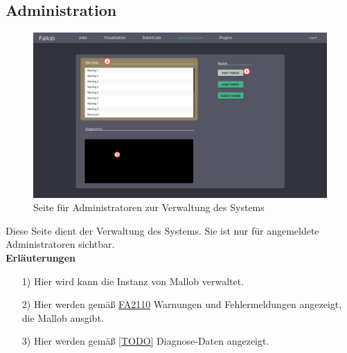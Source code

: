 \subsection{Administration}
\label{pages:admin}
\begin{figure}[H]
    \centering
    \includegraphics[width=\textwidth]{images-interface/v4_interface/admin_page_4.pdf}
    \caption{Seite für Administratoren zur Verwaltung des Systems}
    \label{fig:admin-page}
\end{figure}
Diese Seite dient der Verwaltung des Systems. Sie ist nur für angemeldete Administratoren sichtbar. \\

\textbf{Erläuterungen}
\begin{itemize}
    \item[1)] Hier wird kann die Instanz von Mallob verwaltet.
    \item[2)] Hier werden gemäß \hyperref[FA:Web-Interface:Anzeigen von Warungen und Fehlermeldungen]{FA2110} Warnungen und Fehlermeldungen angezeigt, die Mallob ausgibt.
    \item[3)] Hier werden gemäß \hyperref[]{[TODO]} Diagnose-Daten angezeigt.
\end{itemize}

